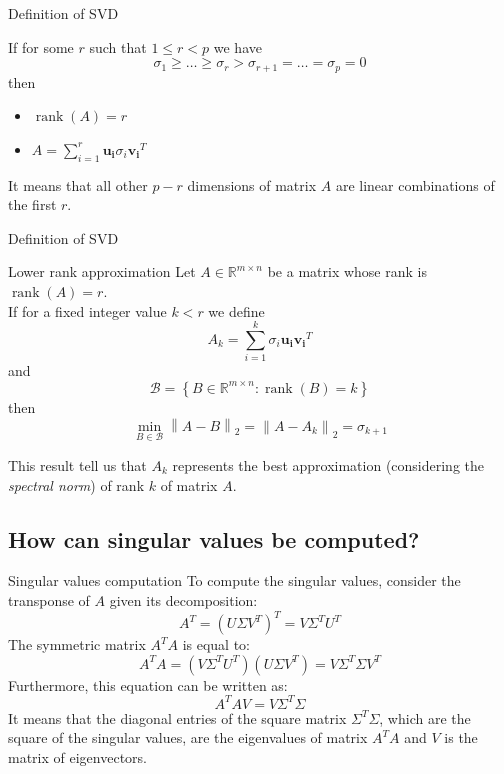\documentclass[10pt]{beamer}
\DeclareMathOperator{\rank}{rank}
\begin{document}
\begin{frame}{Definition of SVD}
    \begin{theorem}
        If for some $r$ such that $ 1 \le r < p $ we have
        $$ \sigma_1 \ge \ldots \ge \sigma_{r} > \sigma_{r + 1} = \ldots = \sigma_p = 0  $$
        then
        \begin{itemize}
            \item $\rank(A) = r$
            \item $ A = \sum \limits_{i = 1}^{r} \bm{u_i} \sigma_i \bm{v_i}^T $
        \end{itemize}
    \end{theorem}

    It means that all other $p-r$ dimensions of matrix $A$ are linear combinations of the first $r$.
\end{frame}

\begin{frame}{Definition of SVD}
    \begin{block}{Lower rank approximation}
        Let $A \in \mathbb{R}^{m \times n}$ be a matrix whose rank is $\rank(A) = r$. \\
        If for a fixed integer value $k < r$ we define
        \begin{equation}
            \label{eq:lower_rank}
            A_k = \sum \limits_{i = 1}^{k} \sigma_i \bm{u_i}  \bm{v_i}^T 
        \end{equation}
        and
        $$ \mathcal{B} = \left\{ B \in \mathbb{R}^{m \times n} : \rank(B) = k \right\}$$
        then 
        $$ \min_{B \in \mathcal{B}} \left\lVert A - B \right\rVert _2 = \left\lVert A - A_k \right\rVert _2 = \sigma_{k + 1} $$
    \end{block}
        
    This result tell us that $A_k$ represents the best approximation (considering the \textit{spectral norm}) of rank $k$ of matrix $A$.
\end{frame}

\subsection{How can singular values be computed?}

\begin{frame}{Singular values computation}
    To compute the singular values, consider the transponse of $A$ given its decomposition:
    $$ A^T = (U \Sigma V^T)^T = V \Sigma^T U^T$$
    The symmetric matrix $A^T A$ is equal to:
    $$ A^T A = ( V \Sigma^T U^T )(U \Sigma V^T) = V \Sigma^T \Sigma V^T$$
    Furthermore, this equation can be written as:
    $$ A^T A V = V \Sigma^T \Sigma $$
    It means that the diagonal entries of the square matrix $ \Sigma^T \Sigma $, which are the square of the singular values, are the eigenvalues of matrix $A^T A$ and $ V $ is the matrix of eigenvectors.
\end{frame}
\end{document}
